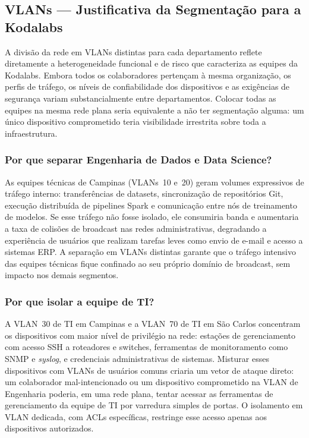 \documentclass[12pt,a4paper]{article}
\begin{document}
\subsection{VLANs — Justificativa da Segmentação para a Kodalabs}

A divisão da rede em VLANs distintas para cada departamento reflete diretamente
a heterogeneidade funcional e de risco que caracteriza as equipes da Kodalabs.
Embora todos os colaboradores pertençam à mesma organização, os perfis de tráfego,
os níveis de confiabilidade dos dispositivos e as exigências de segurança variam
substancialmente entre departamentos. Colocar todas as equipes na mesma rede plana
seria equivalente a não ter segmentação alguma: um único dispositivo comprometido
teria visibilidade irrestrita sobre toda a infraestrutura.

\subsubsection{Por que separar Engenharia de Dados e Data Science?}

As equipes técnicas de Campinas (VLANs~10 e~20) geram volumes expressivos de
tráfego interno: transferências de datasets, sincronização de repositórios Git,
execução distribuída de pipelines Spark e comunicação entre nós de treinamento de
modelos. Se esse tráfego não fosse isolado, ele consumiria banda e aumentaria a
taxa de colisões de broadcast nas redes administrativas, degradando a experiência
de usuários que realizam tarefas leves como envio de e-mail e acesso a sistemas ERP.
A separação em VLANs distintas garante que o tráfego intensivo das equipes técnicas
fique confinado ao seu próprio domínio de broadcast, sem impacto nos demais
segmentos.

\subsubsection{Por que isolar a equipe de TI?}

A VLAN~30 de TI em Campinas e a VLAN~70 de TI em São Carlos concentram os
dispositivos com maior nível de privilégio na rede: estações de gerenciamento com
acesso SSH a roteadores e switches, ferramentas de monitoramento como SNMP e
\textit{syslog}, e credenciais administrativas de sistemas. Misturar esses
dispositivos com VLANs de usuários comuns criaria um vetor de ataque direto: um
colaborador mal-intencionado ou um dispositivo comprometido na VLAN de Engenharia
poderia, em uma rede plana, tentar acessar as ferramentas de gerenciamento da
equipe de TI por varredura simples de portas. O isolamento em VLAN dedicada, com
ACLs específicas, restringe esse acesso apenas aos dispositivos autorizados.
\end{document}
